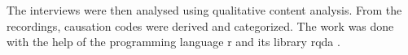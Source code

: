 \documentclass[12pt,a4paper,oneside]{article}
\let\oldcite\cite
\renewcommand*\cite[1]{\textsuperscript{\oldcite{#1}}}
\begin{document}
The interviews were then analysed using qualitative content analysis\cite{analysis1}. From the recordings, causation codes were derived and categorized. The work was done with the help of the programming language {\sc r} and its library {\sc rqda} \cite{rqda}.
\end{document}
